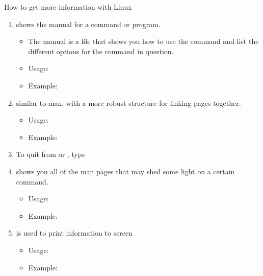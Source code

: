 \documentclass[10pt,t]{beamer}
\begin{document}
\begin{frame}[fragile]{How to get more information with Linux}
  \begin{enumerate}
  \item {} shows the manual for a command or program.
    \begin{itemize}
    \item The manual is a file that shows you how to use the command and list the different options for the command in question.
    \item Usage: 
    \item Example: 
    \end{itemize}
  \item {} similar to man, with a more robust structure for linking pages together.
    \begin{itemize}
    \item Usage: 
    \item Example: 
    \end{itemize}
  \item[] To quit from  or , type 
  \item {} shows you all of the man pages that may shed some light on a certain command.
    \begin{itemize}
    \item Usage: 
    \item Example: 
    \end{itemize}
  \item {} is used to print information to screen
    \begin{itemize}
    \item Usage: 
    \item Example: 
    \end{itemize}
  \end{enumerate}
\end{frame}
\end{document}
